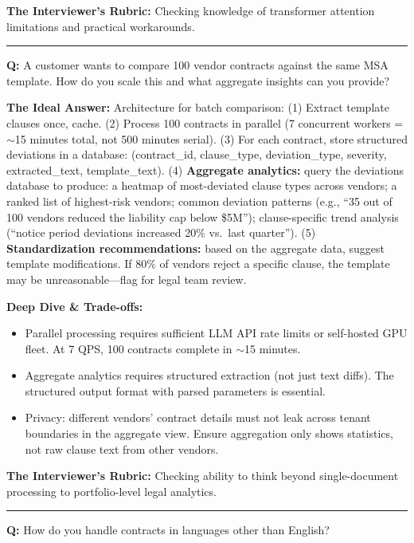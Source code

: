 \textbf{The Interviewer's Rubric:} Checking knowledge of transformer attention limitations and practical workarounds.

\bigskip\hrule\bigskip

\textbf{Q:} A customer wants to compare 100 vendor contracts against the same MSA template. How do you scale this and what aggregate insights can you provide?

\textbf{The Ideal Answer:} Architecture for batch comparison: (1) Extract template clauses once, cache. (2) Process 100 contracts in parallel (7 concurrent workers = $\sim$15 minutes total, not 500 minutes serial). (3) For each contract, store structured deviations in a database: (contract\_id, clause\_type, deviation\_type, severity, extracted\_text, template\_text). (4) \textbf{Aggregate analytics:} query the deviations database to produce: a heatmap of most-deviated clause types across vendors; a ranked list of highest-risk vendors; common deviation patterns (e.g., ``35 out of 100 vendors reduced the liability cap below \$5M''); clause-specific trend analysis (``notice period deviations increased 20\% vs.\ last quarter''). (5) \textbf{Standardization recommendations:} based on the aggregate data, suggest template modifications. If 80\% of vendors reject a specific clause, the template may be unreasonable---flag for legal team review.

\textbf{Deep Dive \& Trade-offs:}
\begin{itemize}
  \item Parallel processing requires sufficient LLM API rate limits or self-hosted GPU fleet. At 7 QPS, 100 contracts complete in $\sim$15 minutes.
  \item Aggregate analytics requires structured extraction (not just text diffs). The structured output format with parsed parameters is essential.
  \item Privacy: different vendors' contract details must not leak across tenant boundaries in the aggregate view. Ensure aggregation only shows statistics, not raw clause text from other vendors.
\end{itemize}

\textbf{The Interviewer's Rubric:} Checking ability to think beyond single-document processing to portfolio-level legal analytics.

\bigskip\hrule\bigskip

\textbf{Q:} How do you handle contracts in languages other than English?

